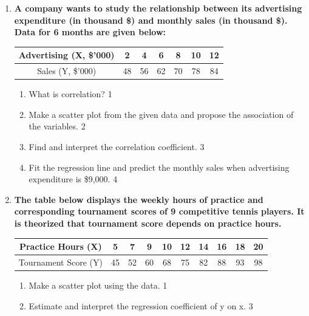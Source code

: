\documentclass[a4paper,oneside]{book}
\begin{document}
\begin{enumerate}
\begin{enumerate}
    \item
    Estimate the regression coefficient of x on y. Is this model realistic? Explain. \hfill 4
\end{enumerate}

\item
  \textbf{A company wants to study the relationship between its advertising expenditure (in thousand \$) and monthly sales (in thousand \$). Data for 6 months are given below:}

\begin{table}[h!]
\centering
\begin{tabular}{c|c|c|c|c|c|c}
Advertising (X, \$'000) & 2 & 4 & 6 & 8 & 10 & 12 \\ \hline
Sales (Y, \$'000) & 48 & 56 & 62 & 70 & 78 & 84 \\
\end{tabular}
\end{table}

\begin{enumerate}
    \item What is correlation? \hfill 1
    \item Make a scatter plot from the given data and propose the association of the variables. \hfill 2
    \item
    Find and interpret the correlation coefficient. \hfill 3
    
    \item
    Fit the regression line and predict the monthly sales when advertising expenditure is \$9,000. \hfill 4
\end{enumerate}

\item
  \textbf{The table below displays the weekly hours of practice and corresponding tournament scores of 9 competitive tennis players. It is theorized that tournament score depends on practice hours.}

\begin{table}[h!]
\centering
\begin{tabular}{c|c|c|c|c|c|c|c|c|c}
Practice Hours (X) & 5 & 7 & 9 & 10 & 12 & 14 & 16 & 18 & 20 \\ \hline
Tournament Score (Y) & 45 & 52 & 60 & 68 & 75 & 82 & 88 & 93 & 98 \\
\end{tabular}
\end{table}

\begin{enumerate}
    \item Make a scatter plot using the data. \hfill 1
    \item
    Estimate and interpret the regression coefficient of y on x. \hfill 3
    

\end{enumerate}
\end{enumerate}
\end{document}
